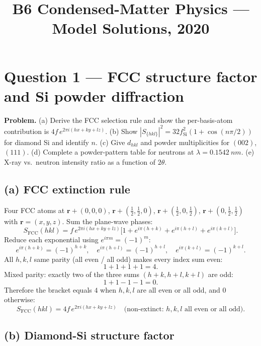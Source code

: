 \documentclass[11pt]{article}
\title{B6 Condensed-Matter Physics --- Model Solutions, 2020}
\author{}
\date{}
\begin{document}
\maketitle

\section*{Question 1 --- FCC structure factor and Si powder diffraction}

\textbf{Problem.} (a) Derive the FCC selection rule and show the per-basis-atom contribution is $4f\,e^{2\pi i(hx+ky+lz)}$. (b) Show $|S_{\{hkl\}}|^2 = 32 f_\text{Si}^2(1+\cos(n\pi/2))$ for diamond Si and identify $n$. (c) Give $d_{hkl}$ and powder multiplicities for $(002)$, $(111)$. (d) Complete a powder-pattern table for neutrons at $\lambda = \SI{0.1542}{nm}$. (e) X-ray vs.\ neutron intensity ratio as a function of $2\theta$.

\subsection*{(a) FCC extinction rule}

Four FCC atoms at $\bm r + (0,0,0)$, $\bm r+(\tfrac12,\tfrac12,0)$, $\bm r+(\tfrac12,0,\tfrac12)$, $\bm r+(0,\tfrac12,\tfrac12)$ with $\bm r = (x,y,z)$. Sum the plane-wave phases:
\[
S_\text{FCC}(hkl) = f\,e^{2\pi i(hx+ky+lz)}\bigl[1 + e^{i\pi(h+k)} + e^{i\pi(h+l)} + e^{i\pi(k+l)}\bigr].
\]
Reduce each exponential using $e^{i\pi m} = (-1)^m$:
\[
e^{i\pi(h+k)} = (-1)^{h+k},\quad e^{i\pi(h+l)} = (-1)^{h+l},\quad e^{i\pi(k+l)} = (-1)^{k+l}.
\]
All $h,k,l$ same parity (all even / all odd) makes every index sum even:
\[
1 + 1 + 1 + 1 = 4.
\]
Mixed parity: exactly two of the three sums $(h+k,h+l,k+l)$ are odd:
\[
1 + 1 - 1 - 1 = 0.
\]
Therefore the bracket equals $4$ when $h,k,l$ are all even or all odd, and $0$ otherwise:
\begin{equation}
\boxed{\;S_\text{FCC}(hkl) = 4f\,e^{2\pi i(hx+ky+lz)}\quad\text{(non-extinct: }h,k,l\text{ all even or all odd)}.\;}
\label{eq:fcc-factor}
\end{equation}

\subsection*{(b) Diamond-Si structure factor}
\end{document}
